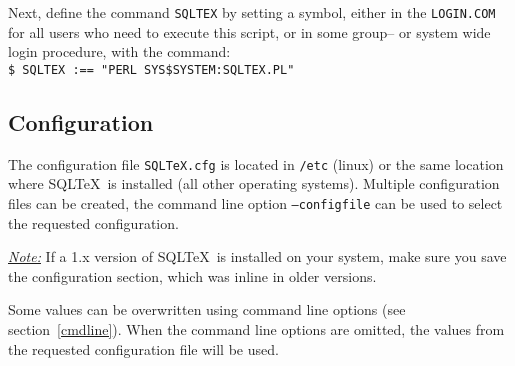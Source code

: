 \documentclass{article}
\newcommand{\vs}{\vspace{3mm}}
\begin{document}
\vs

Next, define the command \texttt{SQLTEX} by setting a symbol,
either in the \texttt{LOGIN.COM} for all users who need to execute this script, or in some group-- or
system wide login procedure, with the command:  \\
\texttt{\$ SQLTEX :== "PERL SYS\$SYSTEM:SQLTEX.PL"} 

\subsection{Configuration}\label{config}

The configuration file \texttt{SQLTeX.cfg} is located in \texttt{/etc} (linux) or the same location where
SQL\TeX\ is installed (all other operating systems).
Multiple configuration files can be created, the command line option \texttt{--configfile} can be used to
select the requested configuration.

\vs

\noindent\hspace{-3mm}\textit{\underline{Note:}} If a 1.x version of SQL\TeX\ is installed on your system,
make sure you save the configuration section, which was inline in older versions.

\vs

Some values can be overwritten using command line options (see section~\ref{cmdline}). When the command line options are omitted, the values from the requested configuration file will be used.
\end{document}
